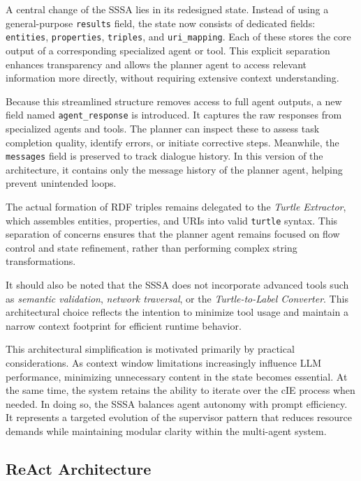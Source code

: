 \documentclass[a4paper,oneside,bibliography=totoc]{scrbook}
\begin{document}
A central change of the \ac{SSSA} lies in its redesigned state. Instead of using a general-purpose \texttt{results} field, the state now consists of dedicated fields: \texttt{entities}, \texttt{properties}, \texttt{triples}, and \texttt{uri\_mapping}. Each of these stores the core output of a corresponding specialized agent or tool. This explicit separation enhances transparency and allows the planner agent to access relevant information more directly, without requiring extensive context understanding.

Because this streamlined structure removes access to full agent outputs, a new field named \texttt{agent\_response} is introduced. It captures the raw responses from specialized agents and tools. The planner can inspect these to assess task completion quality, identify errors, or initiate corrective steps. Meanwhile, the \texttt{messages} field is preserved to track dialogue history. In this version of the architecture, it contains only the message history of the planner agent, helping prevent unintended loops.

The actual formation of RDF triples remains delegated to the \textit{Turtle Extractor}, which assembles entities, properties, and URIs into valid \texttt{turtle} syntax. This separation of concerns ensures that the planner agent remains focused on flow control and state refinement, rather than performing complex string transformations.

It should also be noted that the \ac{SSSA} does not incorporate advanced tools such as \textit{semantic validation}, \textit{network traversal}, or the \textit{Turtle-to-Label Converter}. This architectural choice reflects the intention to minimize tool usage and maintain a narrow context footprint for efficient runtime behavior.

This architectural simplification is motivated primarily by practical considerations. As context window limitations increasingly influence \ac{LLM} performance, minimizing unnecessary content in the state becomes essential. At the same time, the system retains the ability to iterate over the \ac{cIE} process when needed. In doing so, the \ac{SSSA} balances agent autonomy with prompt efficiency. It represents a targeted evolution of the supervisor pattern that reduces resource demands while maintaining modular clarity within the multi-agent system.

\subsection{ReAct Architecture}
\label{subsec:react}
\end{document}
